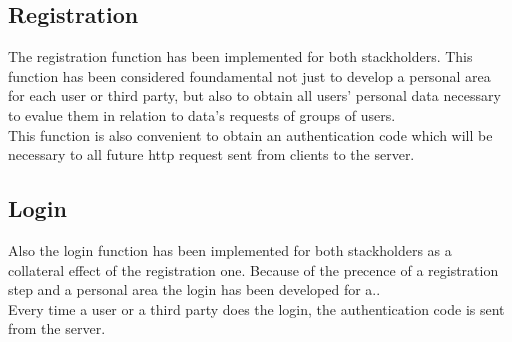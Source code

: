 \subsection{Registration}
The registration function has been implemented for both stackholders. This function has been considered foundamental not just to develop a personal area for each user or third party, but also to obtain all  users' personal data necessary to evalue them in relation to data's requests of groups of users.\\
This function is also convenient to obtain an authentication code which will be necessary to all future http request sent from clients to the server. 

\subsection{Login}
Also the login function has been implemented for both stackholders as a collateral effect of the registration one. Because of the precence of a registration step and a personal area the login has been developed for a..\\
Every time a user or a third party does the login, the authentication code is sent from the server.

